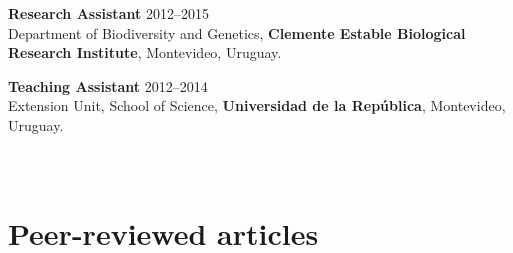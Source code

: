 \begin{innerlist}
\item[]{\bf Research Assistant}
\hfill {2012--2015}\\
Department of Biodiversity and Genetics, {\bf Clemente Estable Biological Research Institute}, Montevideo, Uruguay.\\

\item[]{\bf Teaching Assistant}
\hfill {2012--2014}\\
Extension Unit, School of Science, {\bf Universidad de la Rep\'{u}blica}, Montevideo, Uruguay.\\\\\\

\end{innerlist}


\HRule

\section{Peer-reviewed articles}

